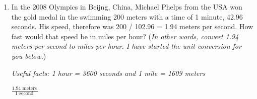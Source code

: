 \documentclass[12pt]{article}
\begin{document}
\begin{enumerate}
\item In the 2008 Olympics in Beijng, China, Michael Phelps from the USA won the gold medal in the swimming 200 meters with a time of 1 minute, 42.96 seconds.  His speed, therefore was 200 / 102.96 = 1.94 meters per second.  How fast would that speed be in miles per hour? (\emph{In other words, convert 1.94 meters per second to miles per hour.  I have started the unit conversion for you below.})

\emph{Useful facts:  1 hour = 3600 seconds and 1 mile = 1609 meters}
\vspace{0.1in}

$ \displaystyle \frac{ 1.94 \mbox{ meters } }{1 \mbox{ second } }$
\vfill
\end{enumerate}




\newpage
\end{document}
